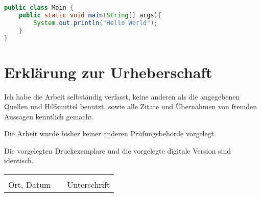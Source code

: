 \documentclass{mi-document/mi-graduation}
\begin{document}
\begin{lstlisting}[captionpos=b, belowcaptionskip=4pt, caption=Hello World (Java), language=Java]
public class Main {
	public static void main(String[] args){
		System.out.println("Hello World");
	}
}
\end{lstlisting}

\newpage

{}


\newpage
{}
\section*{Erklärung zur Urheberschaft}
Ich habe die Arbeit selbständig verfasst, keine anderen als die angegebenen Quellen und Hilfsmittel benutzt, sowie alle Zitate und Übernahmen von fremden Aussagen kenntlich gemacht.

\noindent Die Arbeit wurde bisher keiner anderen Prüfungsbehörde vorgelegt.

\noindent Die vorgelegten Druckexemplare und die vorgelegte digitale Version sind identisch. 
\vskip 2cm
\noindent
\begin{tabular}{lp{6em}r}
 \hspace{5cm}   && \hspace{5cm} \\\cline{1-1}\cline{3-3}
 Ort, Datum     && Unterschrift
\end{tabular}

\newpage
\appendix

\end{document}
